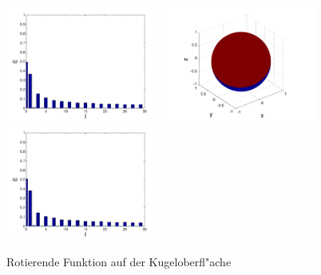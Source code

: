 \begin{figure}
\includegraphics[width=0.45\textwidth]{kugel/kSpektrum/Kugel_3_2.pdf}
\includegraphics[width=0.45\textwidth]{kugel/kSpektrum/Kugel_4_1.pdf}
\includegraphics[width=0.45\textwidth]{kugel/kSpektrum/Kugel_4_2.pdf}
\caption{Rotierende Funktion auf der Kugeloberfl"ache
\label{skript:Spektrum2}}
\end{figure}
